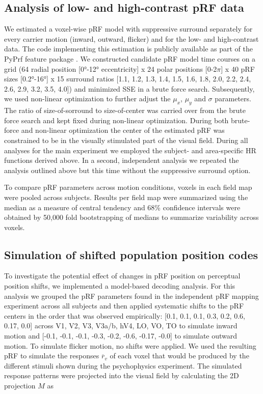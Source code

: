 \subsection{Analysis of low- and high-contrast pRF data}
We estimated a voxel-wise pRF model with suppressive surround separately for every carrier motion (inward, outward, flicker) and for the low- and high-contrast data. The code implementing this estimation is publicly available as part of the PyPrf feature package \parencite{pyprf_feature}. We constructed candidate pRF model time courses on a grid (64 radial position [0°-12° eccentricity] x 24 polar positions [0-2$\pi$] x 40 pRF sizes [0.2°-16°] x 15 surround ratios [1.1, 1.2, 1.3, 1.4, 1.5, 1.6, 1.8, 2.0, 2.2, 2.4, 2.6, 2.9, 3.2, 3.5, 4.0]) and minimized SSE in a brute force search. Subsequently, we used non-linear optimization to further adjust the $\mu_x$, $\mu_y$ and $\sigma$ parameters. The ratio of size-of-sorround to size-of-center was carried over from the brute force search and kept fixed during non-linear optimization. During both brute-force and non-linear optimization the center of the estimated pRF was constrained to be in the visually stimulated part of the visual field. During all analyses for the main experiment we employed the subject- and area-specific HR functions derived above. In a second, independent analysis we repeated the analysis outlined above but this time without the suppressive surround option.

To compare pRF parameters across motion conditions, voxels in each field map were pooled across subjects. Results per field map were summarized using the median as a measure of central tendency and 68\% confidence intervals were obtained by 50,000 fold bootstrapping of medians to summarize variability across voxels.

\subsection{Simulation of shifted population position codes}
To investigate the potential effect of changes in pRF position on perceptual position shifts, we implemented a model-based decoding analysis. For this analysis we grouped the pRF parameters found in the independent pRF mapping experiment across all subjects and then applied systematic shifts to the pRF centers in the order that was observed empirically: [0.1, 0.1, 0.1, 0.3, 0.2, 0.6, 0.17, 0.0] across V1, V2, V3, V3a/b, hV4, LO, VO, TO to simulate inward motion and [-0.1, -0.1, -0.1, -0.3, -0.2, -0.6, -0.17, -0.0] to simulate outward motion. To simulate flicker motion, no shifts were applied. We used the resulting pRF to simulate the responses $\overline{r}_v$ of each voxel that would be produced by the different stimuli shown during the psychophysics experiment. The simulated response patterns were projected into the visual field by calculating the 2D projection $M$ as

